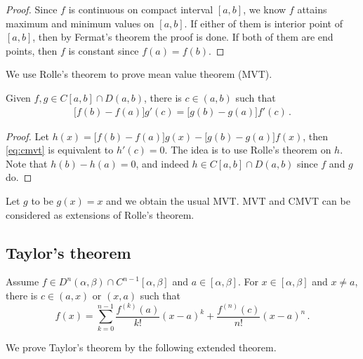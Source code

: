 \documentclass{article}
\begin{document}
\begin{proof}
    Since $ f $ is continuous on compact interval $ [a, b] $, we know $ f $ attains maximum and minimum values on $ [a, b] $. If either of them is interior point of $ [a, b] $, then by Fermat's theorem the proof is done. If both of them are end points, then $ f $ is constant since $ f(a) = f(b) $.
\end{proof}

We use Rolle's theorem to prove mean value theorem (MVT).
\begin{theorem}
    Given $ f, g \in C[a, b] \cap D(a, b) $, there is $ c \in (a, b) $ such that
    \begin{align} \label{eq:cmvt}
        \big[ f(b) - f(a) \big] g'(c) = \big[ g(b) - g(a) \big] f'(c)  \,.
    \end{align}
\end{theorem}
\begin{proof}
    Let $ h(x) = \big[ f(b) - f(a) \big] g(x) - \big[ g(b) - g(a) \big] f(x) $, then \eqref{eq:cmvt} is equivalent to $ h'(c) = 0 $. The idea is to use Rolle's theorem on $ h $. Note that $ h(b) - h(a) = 0 $, and indeed $ h \in C[a, b] \cap D(a, b) $ since $ f $ and $ g $ do.
\end{proof}

Let $ g $ to be $ g(x) = x $ and we obtain the usual MVT. MVT and CMVT can be considered as extensions of Rolle's theorem.

\subsection{Taylor's theorem}
\begin{theorem} \label{thm:taylor}
    Assume $ f \in D^{n} (\alpha, \beta) \cap C^{n - 1} [\alpha, \beta] $ and $ a \in [\alpha, \beta] $. For $ x \in [\alpha, \beta] $ and $ x \neq a $, there is $ c \in (a, x) \text { or } (x, a) $ such that
    \[
        f(x) = \sum_{k = 0}^{n-1} \dfrac{f^{(k)} (a)}{k!} (x - a)^k + \dfrac{f^{(n)}(c)}{n!} (x - a)^n \,.
    \]
\end{theorem}

We prove Taylor's theorem by the following extended theorem.
\end{document}
